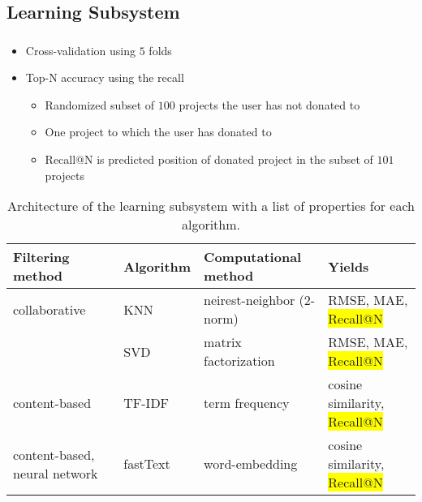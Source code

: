 \documentclass[aspectratio=169]{beamer}
\begin{document}
\subsection{Learning Subsystem}
\begin{frame}
	\frametitle{\insertsection}
	\framesubtitle{\insertsubsection}

	\begin{itemize}
		\item Cross-validation using $5$ folds
		\item Top-N accuracy using the recall~\cite{Cremonesi:2010:PRA:1864708.1864721}
		\begin{itemize}
			\item Randomized subset of $100$ projects the user has not donated to
			\item One project to which the user has donated to
			\item Recall@N is predicted position of donated project in the subset of $101$ projects
		\end{itemize}
	\end{itemize}

	\begin{table}
		\scriptsize
		\centering
		\begin{tabular}{l|lll}
			Filtering method & Algorithm & Computational method & Yields \\
			\hline
			\hline
			collaborative & KNN & neirest-neighbor (2-norm) & RMSE, MAE, \colorbox{yellow}{Recall@N} \\
			& SVD & matrix factorization & RMSE, MAE, \colorbox{yellow}{Recall@N} \\
			\hline
			content-based & TF-IDF & term frequency & cosine similarity, \colorbox{yellow}{Recall@N} \\
			\hline
			content-based, neural network & fastText & word-embedding & cosine similarity, \colorbox{yellow}{Recall@N} \\
		\end{tabular}
		\caption{Architecture of the learning subsystem with a list of properties for each algorithm.}
	\end{table}
\end{frame}
\end{document}
